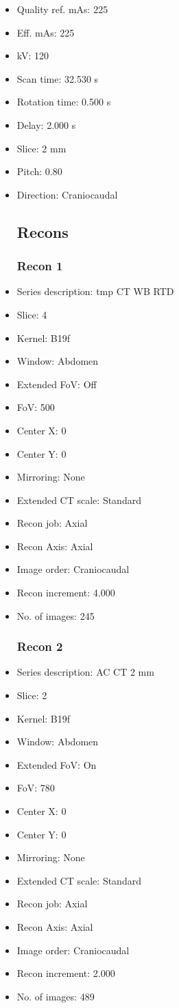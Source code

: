 \documentclass[12pt]{article}
\begin{document}
\begin{itemize}
\subsection{Scan}
\item Quality ref. mAs: 225\item Eff. mAs: 225\item kV: 120\item Scan time: 32.530 s\item Rotation time: 0.500 s\item Delay: 2.000 s\item Slice: 2 mm\item Pitch: 0.80\item Direction: Craniocaudal\subsection{Recons}

\subsubsection{Recon 1}
\item Series description: tmp CT WB RTD
\item Slice: 4
\item Kernel: B19f
\item Window: Abdomen
\item Extended FoV: Off
\item FoV: 500
\item Center X: 0
\item Center Y: 0
\item Mirroring: None
\item Extended CT scale: Standard
\item Recon job: Axial
\item Recon Axis: Axial
\item Image order: Craniocaudal
\item Recon increment: 4.000
\item No. of images: 245
\subsubsection{Recon 2}
\item Series description: AC CT 2 mm
\item Slice: 2
\item Kernel: B19f
\item Window: Abdomen
\item Extended FoV: On
\item FoV: 780
\item Center X: 0
\item Center Y: 0
\item Mirroring: None
\item Extended CT scale: Standard
\item Recon job: Axial
\item Recon Axis: Axial
\item Image order: Craniocaudal
\item Recon increment: 2.000
\item No. of images: 489

\end{itemize}
\end{document}
